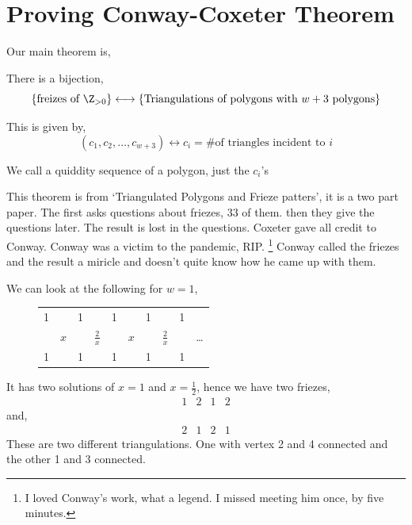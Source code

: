 \documentclass{article}
\begin{document}
\section{Proving Conway-Coxeter Theorem}
Our main theorem is,
\begin{nthm}
  There is a bijection,
  $$ \{\text{freizes of $\Z_{>0}$}\} \longleftrightarrow \{\text{Triangulations of polygons with $w + 3$ polygons} \} $$
\end{nthm}
This is given by,
$$ (c_1,c_2,\dots,c_{w+3}) \longleftrightarrow c_i = \text{\# of triangles incident to $i$} $$

\begin{ndefi}
  We call a quiddity sequence of a polygon, just the $c_i$'s
\end{ndefi}

This theorem is from `Triangulated Polygons and Frieze patters', it is a two part paper. The first asks questions about friezes, 33 of them. then they give the questions later. The result is lost in the questions. Coxeter gave all credit to Conway. Conway was a victim to the pandemic, RIP. \footnote{I loved Conway's work, what a legend. I missed meeting him once, by five minutes.}
Conway called the friezes and the result a miricle and doesn't quite know how he came up with them.

\begin{eg}
  We can look at the following for $w=1$,
  \begin{figure}[!ht]
  \centering
  \begin{tabular}{cccccccccc}
   1&&1&&1&&1&&1& \\
   &$x$&&$\frac{2}{x}$&&$x$&&$\frac{2}{x}$&&\dots\\
   1&&1&&1&&1&&1& \\
  \end{tabular}
  \end{figure}
  It has two solutions of $x = 1$ and $x = \frac{1}{2}$, hence we have two friezes,
  $$ \begin{matrix}
    1 & 2 & 1 & 2
  \end{matrix} $$
  and,
  $$ \begin{matrix}
    2 & 1 & 2 & 1
  \end{matrix} $$
  These are two different triangulations. One with vertex 2 and 4 connected and the other 1 and 3 connected.
\end{eg}
\end{document}
